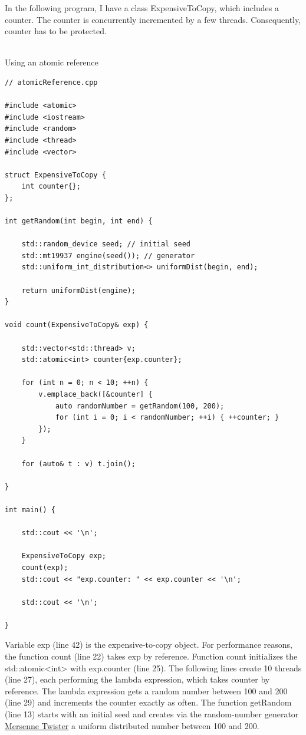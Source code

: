 In the following program, I have a class ExpensiveToCopy, which includes a counter. The counter is concurrently incremented by a few threads. Consequently, counter has to be protected.

\hspace*{\fill} \\ %
\noindent
Using an atomic reference
\begin{lstlisting}[style=styleCXX]
// atomicReference.cpp

#include <atomic>
#include <iostream>
#include <random>
#include <thread>
#include <vector>

struct ExpensiveToCopy {
	int counter{};
};

int getRandom(int begin, int end) {
	
	std::random_device seed; // initial seed
	std::mt19937 engine(seed()); // generator
	std::uniform_int_distribution<> uniformDist(begin, end);
	
	return uniformDist(engine);
}

void count(ExpensiveToCopy& exp) {

	std::vector<std::thread> v;
	std::atomic<int> counter{exp.counter};
	
	for (int n = 0; n < 10; ++n) {
		v.emplace_back([&counter] {
			auto randomNumber = getRandom(100, 200);
			for (int i = 0; i < randomNumber; ++i) { ++counter; }
		});
	}
	
	for (auto& t : v) t.join();

}

int main() {
	
	std::cout << '\n';
	
	ExpensiveToCopy exp;
	count(exp);
	std::cout << "exp.counter: " << exp.counter << '\n';
	
	std::cout << '\n';

}
\end{lstlisting}

Variable exp (line 42) is the expensive-to-copy object. For performance reasons, the function count (line 22) takes exp by reference. Function count initializes the std::atomic<int> with exp.counter (line 25). The following lines create 10 threads (line 27), each performing the lambda expression, which takes counter by reference. The lambda expression gets a random number between 100 and 200 (line 29) and increments the counter exactly as often. The function getRandom (line 13) starts with an initial seed and creates via the random-number generator \href{https://en.wikipedia.org/wiki/Mersenne_Twister}{Mersenne Twister} a uniform distributed number between 100 and 200.

